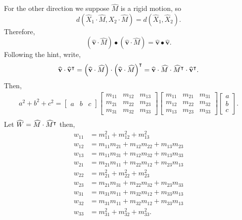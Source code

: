 \documentclass[newpage,hints,handout]{ximera}
\begin{document}
\begin{problem}
\begin{freeResponse}
For the other direction we suppose $\hat{M}$ is a rigid motion, so
\[
 d\left( \hat{X}_{1}  \cdot\hat{M},\hat{X}_{2}
   \cdot\hat{M}\right) = d\left(  \hat{X}_{1},\hat{X}_{2}\right).
\]
Therefore, 
\[
	\left(  \hat{\mathbf v}  \cdot\hat{M} \right) \bullet\left(
    \hat{\mathbf v}  \cdot\hat{M}\right)  =\hat{\mathbf v}\bullet\hat{\mathbf v}.
 \]
Following the hint, write,
\[
\widehat{\mathbf v}\cdot\widehat{\mathbf v}^\intercal= \left(  \widehat{\mathbf v}  \cdot\widehat{M} \right) \cdot\left(
    \widehat{\mathbf v}  \cdot\widehat{M}\right)^\intercal  = \widehat{\mathbf v} \cdot\widehat{M} \cdot \widehat{M}^\intercal \cdot \widehat{\mathbf v}^\intercal .
\]
Then, 
\begin{align*}
a^2 + b^2 +c^2
=
\begin{bmatrix}
      a & b & c
    \end{bmatrix}
\begin{bmatrix}
	m_{11} & m_{12} & m_{13}\\
	m_{21} & m_{22} & m_{23}\\
	m_{31} & m_{32} & m_{33}
\end{bmatrix}
\begin{bmatrix}
	m_{11} & m_{21} & m_{31}\\
	m_{12} & m_{22} & m_{32}\\
	m_{13} & m_{23} & m_{33}
\end{bmatrix}
\begin{bmatrix}
      a \\
      b \\
      c
    \end{bmatrix}. \\
 \end{align*}
 Let $\widehat{W} = \widehat{M} \cdot \widehat{M}^\intercal$ then,
 \begin{align*}
 w_{11} &= m_{11}^2 + m_{12}^2 +  m_{13}^2 \\
 w_{12} &= m_{11}m_{21} + m_{12}m_{22} +m_{13}m_{23}\\
 w_{13} &= m_{11}m_{31} + m_{12}m_{32} +m_{13}m_{33}\\
 w_{21} &= m_{21}m_{11} + m_{22}m_{12} +m_{23}m_{13} \\
 w_{22} &= m_{21}^2 + m_{22}^2 +  m_{23}^2 \\
 w_{23} &=  m_{21}m_{31} + m_{22}m_{32} +m_{23}m_{33} \\
 w_{31} &= m_{31}m_{11} + m_{32}m_{12} +m_{33}m_{13} \\
 w_{32} &= m_{31}m_{11} + m_{32}m_{12} +m_{33}m_{13}\\
 w_{33} &= m_{31}^2 + m_{32}^2 +  m_{33}^2.
 \end{align*}    
   

\end{freeResponse}
\end{problem}
\end{document}
